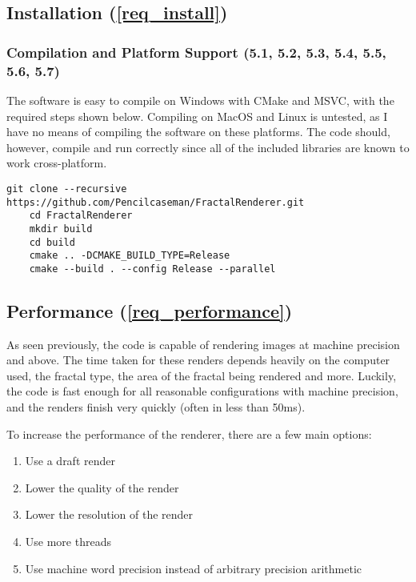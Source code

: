 \subsection{Installation (\ref{req_install})}

\subsubsection{Compilation and Platform Support (5.1, 5.2, 5.3, 5.4, 5.5, 5.6, 5.7)}

The software is easy to compile on Windows with CMake and MSVC, with the required steps shown below. Compiling on MacOS and Linux is untested, as I have no means of compiling the software on these platforms. The code should, however, compile and run correctly since all of the included libraries are known to work cross-platform.

\begin{lstlisting}[]
	git clone --recursive https://github.com/Pencilcaseman/FractalRenderer.git
	cd FractalRenderer
	mkdir build
	cd build
	cmake .. -DCMAKE_BUILD_TYPE=Release
	cmake --build . --config Release --parallel
\end{lstlisting}

\subsection{Performance (\ref{req_performance})}

As seen previously, the code is capable of rendering images at machine precision and above. The time taken for these renders depends heavily on the computer used, the fractal type, the area of the fractal being rendered and more. Luckily, the code is fast enough for all reasonable configurations with machine precision, and the renders finish very quickly (often in less than 50ms).

To increase the performance of the renderer, there are a few main options:

\begin{enumerate}
	\item Use a draft render
	\item Lower the quality of the render
	\item Lower the resolution of the render
	\item Use more threads
	\item Use machine word precision instead of arbitrary precision arithmetic
\end{enumerate}
